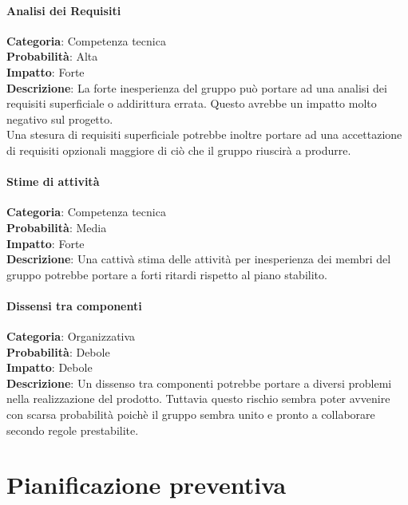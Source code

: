 \documentclass{scalatekids-article}
\begin{document}
\paragraph{Analisi dei Requisiti}
\textbf{Categoria}: Competenza tecnica\\
\textbf{Probabilità}: Alta\\
\textbf{Impatto}: Forte\\
\textbf{Descrizione}: La forte inesperienza del gruppo può portare ad una analisi dei requisiti superficiale o addirittura errata. Questo avrebbe un impatto molto negativo sul progetto.\\Una stesura di requisiti superficiale potrebbe inoltre portare ad una accettazione di requisiti opzionali maggiore di ciò che il gruppo riuscirà a produrre.
\paragraph{Stime di attività}
\textbf{Categoria}: Competenza tecnica\\
\textbf{Probabilità}: Media\\
\textbf{Impatto}: Forte\\
\textbf{Descrizione}: Una cattivà stima delle attività per inesperienza dei membri del gruppo potrebbe portare a forti ritardi rispetto al piano stabilito.
\paragraph{Dissensi tra componenti}
\textbf{Categoria}: Organizzativa\\
\textbf{Probabilità}: Debole\\
\textbf{Impatto}: Debole\\
\textbf{Descrizione}: Un dissenso tra componenti potrebbe portare a diversi problemi nella realizzazione del prodotto. Tuttavia questo rischio sembra poter avvenire con scarsa probabilità poichè il gruppo sembra unito e pronto a collaborare secondo regole prestabilite.
\section{Pianificazione preventiva}
\end{document}
